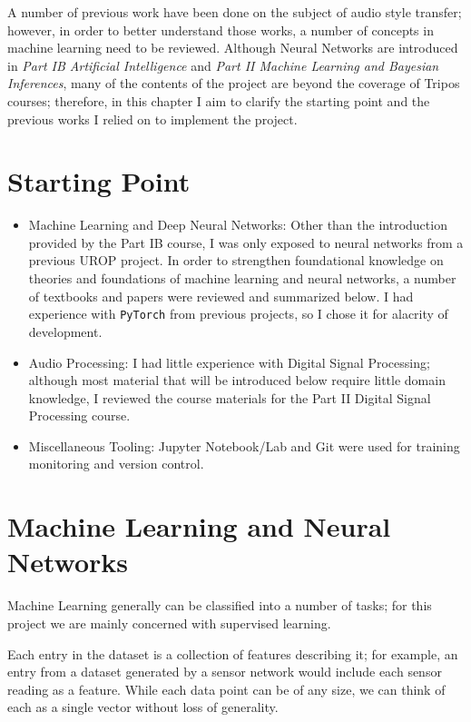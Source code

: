\documentclass[12pt,a4paper,]{report}
\begin{document}
A number of previous work have been done on the subject of audio style
transfer; however, in order to better understand those works, a number
of concepts in machine learning need to be reviewed. Although Neural
Networks are introduced in \emph{Part IB Artificial Intelligence} and
\emph{Part II Machine Learning and Bayesian Inferences}, many of the
contents of the project are beyond the coverage of Tripos courses;
therefore, in this chapter I aim to clarify the starting point and the
previous works I relied on to implement the project.

\hypertarget{starting-point}{%
\section{Starting Point}\label{starting-point}}

\begin{itemize}
\item
  Machine Learning and Deep Neural Networks: Other than the introduction
  provided by the Part IB course, I was only exposed to neural networks
  from a previous UROP project. In order to strengthen foundational
  knowledge on theories and foundations of machine learning and neural
  networks, a number of textbooks and papers were reviewed and
  summarized below. I had experience with \texttt{PyTorch} from previous
  projects, so I chose it for alacrity of development.
\item
  Audio Processing: I had little experience with Digital Signal
  Processing; although most material that will be introduced below
  require little domain knowledge, I reviewed the course materials for
  the Part II Digital Signal Processing course.
\item
  Miscellaneous Tooling: Jupyter Notebook/Lab and Git were used for
  training monitoring and version control.
\end{itemize}

\hypertarget{machine-learning-and-neural-networks}{%
\section{Machine Learning and Neural
Networks}\label{machine-learning-and-neural-networks}}

Machine Learning generally can be classified into a number of tasks; for
this project we are mainly concerned with supervised learning.

Each entry in the dataset is a collection of features describing it; for
example, an entry from a dataset generated by a sensor network would
include each sensor reading as a feature. While each data point can be
of any size, we can think of each as a single vector without loss of
generality.
\end{document}
